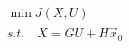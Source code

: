 \documentclass{article}
\begin{document}
\thispagestyle{empty}

$$
\begin{array}{l}
\min J(X,U)\\
s.t.\quad X=GU + H\vec{x}_0
\end{array}
$$
\end{document}
